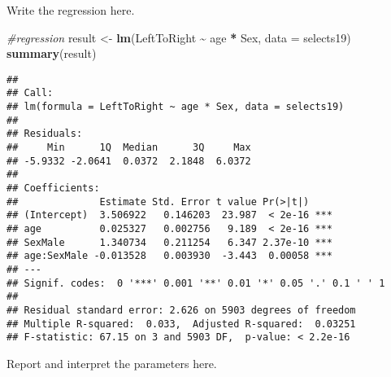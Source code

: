 \documentclass[
]{book}
\newenvironment{Shaded}{\begin{snugshade}}{\end{snugshade}}
\newcommand{\AttributeTok}[1]{\textcolor[rgb]{0.13,0.29,0.53}{#1}}
\newcommand{\CommentTok}[1]{\textcolor[rgb]{0.56,0.35,0.01}{\textit{#1}}}
\newcommand{\FunctionTok}[1]{\textcolor[rgb]{0.13,0.29,0.53}{\textbf{#1}}}
\newcommand{\NormalTok}[1]{#1}
\newcommand{\OtherTok}[1]{\textcolor[rgb]{0.56,0.35,0.01}{#1}}
\newcommand{\SpecialCharTok}[1]{\textcolor[rgb]{0.81,0.36,0.00}{\textbf{#1}}}
\begin{document}
Write the regression here.

\begin{Shaded}
\begin{Highlighting}[]
\CommentTok{\#regression}
\NormalTok{result }\OtherTok{\textless{}{-}} \FunctionTok{lm}\NormalTok{(LeftToRight }\SpecialCharTok{\textasciitilde{}}\NormalTok{ age }\SpecialCharTok{*}\NormalTok{ Sex, }\AttributeTok{data =}\NormalTok{ selects19)}
\FunctionTok{summary}\NormalTok{(result)}
\end{Highlighting}
\end{Shaded}

\begin{verbatim}
## 
## Call:
## lm(formula = LeftToRight ~ age * Sex, data = selects19)
## 
## Residuals:
##     Min      1Q  Median      3Q     Max 
## -5.9332 -2.0641  0.0372  2.1848  6.0372 
## 
## Coefficients:
##              Estimate Std. Error t value Pr(>|t|)    
## (Intercept)  3.506922   0.146203  23.987  < 2e-16 ***
## age          0.025327   0.002756   9.189  < 2e-16 ***
## SexMale      1.340734   0.211254   6.347 2.37e-10 ***
## age:SexMale -0.013528   0.003930  -3.443  0.00058 ***
## ---
## Signif. codes:  0 '***' 0.001 '**' 0.01 '*' 0.05 '.' 0.1 ' ' 1
## 
## Residual standard error: 2.626 on 5903 degrees of freedom
## Multiple R-squared:  0.033,  Adjusted R-squared:  0.03251 
## F-statistic: 67.15 on 3 and 5903 DF,  p-value: < 2.2e-16
\end{verbatim}

Report and interpret the parameters here.
\end{document}
